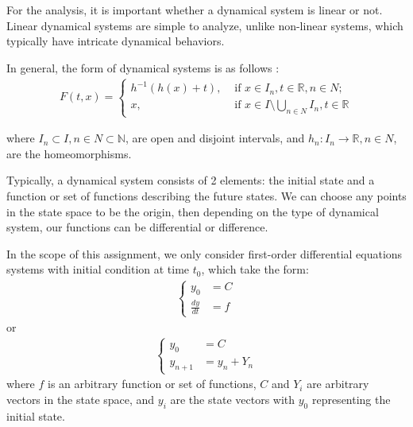 \documentclass[a4paper]{article}
\numberwithin{equation}{section}
\begin{document}
For the analysis, it is important whether a dynamical system is linear or not.
Linear dynamical systems are simple to analyze, unlike non-linear systems, which typically have intricate dynamical behaviors.

In general, the form of dynamical systems is as follows \cite{sibirsky1975topology}:
\begin{align*}
  F(t, x) = \begin{cases}
    h^{-1}(h(x) + t), & \text{ if } x \in I_n, t \in \mathbb{R}, n \in N;                     \\
    x,                & \text{ if } x \in I \setminus \bigcup_{n \in N} I_n, t \in \mathbb{R}
  \end{cases}
\end{align*}

where \(I_n \subset I, n \in N \subset \mathbb{N}\), are open and disjoint intervals, and \(h_n : I_n \rightarrow \mathbb{R}, n \in N\), are the homeomorphisms.

Typically, a dynamical system consists of 2 elements: the initial state and a function or set of functions describing the future states.
We can choose any points in the state space to be the origin, then depending on the type of dynamical system, our functions can be differential or difference.

In the scope of this assignment, we only consider first-order differential equations systems with initial condition at time \(t_0\), which take the form:
\begin{align*}
  \begin{cases}
    y_0           & = C \\
    \frac{dy}{dt} & = f
  \end{cases}
\end{align*}
or
\begin{align*}
  \begin{cases}
    y_0       & = C         \\
    y_{n + 1} & = y_n + Y_n
  \end{cases}
\end{align*}
where \(f\) is an arbitrary function or set of functions, \(C\) and \(Y_i\) are arbitrary vectors in the state space, and \(y_i\) are the state vectors with \(y_0\) representing the initial state.
\end{document}
